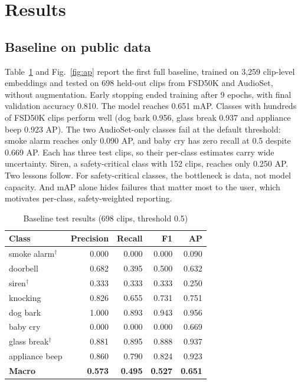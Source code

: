\documentclass[conference]{IEEEtran}
\begin{document}
\section{Results}
\subsection{Baseline on public data}
Table~\ref{tab:baseline} and Fig.~\ref{fig:ap} report the first full baseline, trained on 3,259 clip-level embeddings and tested on 698 held-out clips from FSD50K and AudioSet, without augmentation. Early stopping ended training after 9 epochs, with final validation accuracy 0.810. The model reaches 0.651 mAP. Classes with hundreds of FSD50K clips perform well (dog bark 0.956, glass break 0.937 and appliance beep 0.923 AP). The two AudioSet-only classes fail at the default threshold: smoke alarm reaches only 0.090 AP, and baby cry has zero recall at 0.5 despite 0.669 AP. Each has three test clips, so their per-class estimates carry wide uncertainty. Siren, a safety-critical class with 152 clips, reaches only 0.250 AP. Two lessons follow. For safety-critical classes, the bottleneck is data, not model capacity. And mAP alone hides failures that matter most to the user, which motivates per-class, safety-weighted reporting.

\begin{table}[t]
\caption{Baseline test results (698 clips, threshold 0.5)}
\label{tab:baseline}
\centering\footnotesize
\begin{tabular}{@{}lrrrr@{}}
\toprule
Class & Precision & Recall & F1 & AP \\
\midrule
smoke alarm$^\dagger$ & 0.000 & 0.000 & 0.000 & 0.090 \\
doorbell & 0.682 & 0.395 & 0.500 & 0.632 \\
siren$^\dagger$ & 0.333 & 0.333 & 0.333 & 0.250 \\
knocking & 0.826 & 0.655 & 0.731 & 0.751 \\
dog bark & 1.000 & 0.893 & 0.943 & 0.956 \\
baby cry & 0.000 & 0.000 & 0.000 & 0.669 \\
glass break$^\dagger$ & 0.881 & 0.895 & 0.888 & 0.937 \\
appliance beep & 0.860 & 0.790 & 0.824 & 0.923 \\
\midrule
\textbf{Macro} & \textbf{0.573} & \textbf{0.495} & \textbf{0.527} & \textbf{0.651} \\
\bottomrule
\end{tabular}
\end{table}
\end{document}
